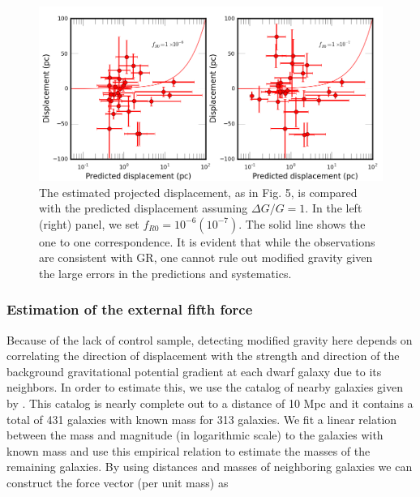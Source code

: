 \documentclass[twocolappendix, numberedappendix]{emulateapj}
\begin{document}
\begin{figure}
\begin{center}
\includegraphics[scale=0.5]{figures/disppred.png}
  \caption{The estimated projected displacement, as in Fig. 5, is compared with the predicted displacement assuming $\Delta
G/G=1$. In the left (right) panel, we set $f_{R0}=10^{-6} (10^{-7})$. 
 The solid
line shows the one to one correspondence. It is evident that while 
the observations are consistent with
GR, one cannot rule out modified gravity 
given the large errors in the predictions and systematics.}
\label{fig:rgdisppred}
\end{center}
\end{figure}

\subsubsection{Estimation of the external fifth force}
Because of the lack of control sample, detecting modified gravity here
depends on correlating the direction of displacement with the strength
and direction of the background gravitational potential gradient at
each dwarf galaxy due to its neighbors.  In order to estimate this,
we use the
catalog of  nearby galaxies given by \citet{kar04}. This catalog is nearly
complete out to a distance of 10 Mpc and it contains a total of 431 galaxies
with known mass for 313 galaxies. We fit a linear relation between the
mass and magnitude (in logarithmic scale) to the galaxies with known mass and
use this empirical relation to estimate the masses of the remaining galaxies.
By using distances and masses of neighboring galaxies we can construct the
force vector (per unit mass) as 
\end{document}
